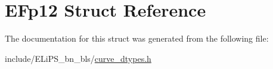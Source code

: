 \hypertarget{struct_e_fp12}{}\section{E\+Fp12 Struct Reference}
\label{struct_e_fp12}


The documentation for this struct was generated from the following file\+:\begin{DoxyCompactItemize}
\item 
include/\+E\+Li\+P\+S\+\_\+bn\+\_\+bls/\hyperlink{curve__dtypes_8h}{curve\+\_\+dtypes.\+h}\end{DoxyCompactItemize}
